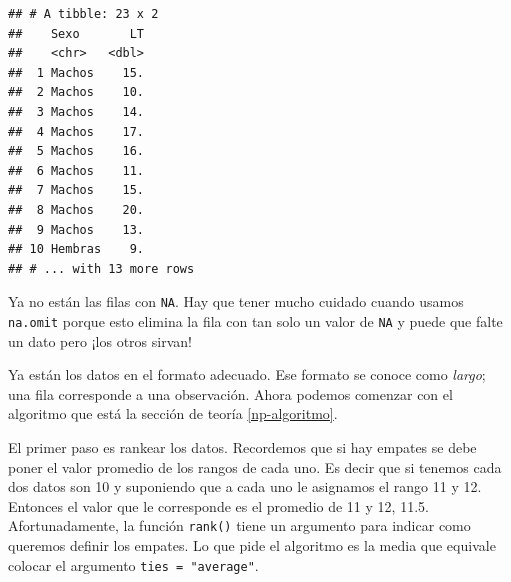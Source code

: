 \documentclass[]{book}
\newenvironment{Shaded}{\begin{snugshade}}{\end{snugshade}}
\newcommand{\DataTypeTok}[1]{\textcolor[rgb]{0.13,0.29,0.53}{#1}}
\newcommand{\KeywordTok}[1]{\textcolor[rgb]{0.13,0.29,0.53}{\textbf{#1}}}
\newcommand{\NormalTok}[1]{#1}
\newcommand{\OperatorTok}[1]{\textcolor[rgb]{0.81,0.36,0.00}{\textbf{#1}}}
\newcommand{\StringTok}[1]{\textcolor[rgb]{0.31,0.60,0.02}{#1}}
\theoremstyle{definition}
\theoremstyle{definition}
\theoremstyle{definition}
\theoremstyle{remark}
\begin{document}
\begin{Shaded}
\end{Shaded}

\begin{verbatim}
## # A tibble: 23 x 2
##    Sexo       LT
##    <chr>   <dbl>
##  1 Machos    15.
##  2 Machos    10.
##  3 Machos    14.
##  4 Machos    17.
##  5 Machos    16.
##  6 Machos    11.
##  7 Machos    15.
##  8 Machos    20.
##  9 Machos    13.
## 10 Hembras    9.
## # ... with 13 more rows
\end{verbatim}

Ya no están las filas con \texttt{NA}. Hay que tener mucho cuidado
cuando usamos \texttt{na.omit} porque esto elimina la fila con tan solo
un valor de \texttt{NA} y puede que falte un dato pero ¡los otros
sirvan!

Ya están los datos en el formato adecuado. Ese formato se conoce como
\emph{largo}; una fila corresponde a una observación. Ahora podemos
comenzar con el algoritmo que está la sección de teoría
\ref{np-algoritmo}.

El primer paso es rankear los datos. Recordemos que si hay empates se
debe poner el valor promedio de los rangos de cada uno. Es decir que si
tenemos cada dos datos son 10 y suponiendo que a cada uno le asignamos
el rango 11 y 12. Entonces el valor que le corresponde es el promedio de
11 y 12, 11.5. Afortunadamente, la función \texttt{rank()} tiene un
argumento para indicar como queremos definir los empates. Lo que pide el
algoritmo es la media que equivale colocar el argumento
\texttt{ties\ =\ "average"}.

\begin{Shaded}
\end{Shaded}
\end{document}
